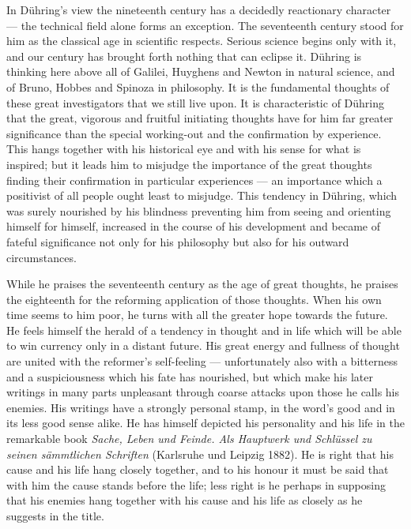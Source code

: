 \documentclass[12pt,a4paper]{book}
\newcommand{\opage}[1]{\marginnote{\footnotesize\textit{[#1]}}}
\begin{document}
In Dühring's view the nineteenth century has a decidedly reactionary character
--- the technical field alone forms an exception. The seventeenth century stood
for him as the classical age in scientific respects. Serious science begins only
with it, and our century has brought forth nothing that can eclipse it. Dühring
is thinking here above all of Galilei, Huyghens and Newton in natural science,
and of Bruno, Hobbes and Spinoza in philosophy. It is the fundamental thoughts of
these great investigators that we still live upon. It is characteristic of
Dühring that the great, vigorous and fruitful initiating thoughts have for him
far greater significance than the special working-out and the confirmation by
experience. This hangs together with his historical eye and with his sense for
what is inspired; but it leads him to misjudge the importance of the great
thoughts finding their confirmation in particular experiences --- an importance
which a positivist of all people ought least to misjudge. This tendency in
Dühring, which was surely nourished by his blindness preventing him from seeing
and orienting himself for himself, increased in the course of his development and
became of \opage{555}fateful significance not only for his philosophy but also for his
outward circumstances.

While he praises the seventeenth century as the age of great thoughts, he praises
the eighteenth for the reforming application of those thoughts. When his own time
seems to him poor, he turns with all the greater hope towards the future. He
feels himself the herald of a tendency in thought and in life which will be able
to win currency only in a distant future. His great energy and fullness of
thought are united with the reformer's self-feeling --- unfortunately also with a
bitterness and a suspiciousness which his fate has nourished, but which make his
later writings in many parts unpleasant through coarse attacks upon those he
calls his enemies. His writings have a strongly personal stamp, in the word's
good and in its less good sense alike. He has himself depicted his personality
and his life in the remarkable book \textit{Sache, Leben und Feinde. Als
Hauptwerk und Schlüssel zu seinen sämmtlichen Schriften} (Karlsruhe und Leipzig
1882). He is right that his cause and his life hang closely together, and to his
honour it must be said that with him the cause stands before the life; less right
is he perhaps in supposing that his enemies hang together with his cause and his
life as closely as he suggests in the title.
\end{document}
